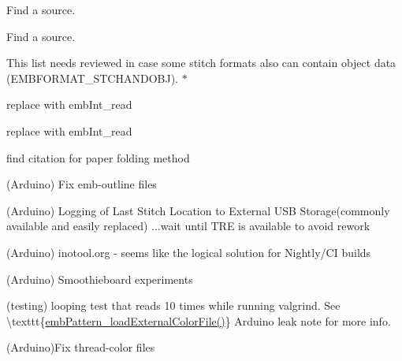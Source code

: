 \begin{DoxyRefList}
\label{todo__todo000040}%
%
Find a source.

\label{todo__todo000041}%
%
Find a source. 
\item[Global \mbox{\hyperlink{formats_8c_a8cb11404ce46501561f956d33f8dcf95}{format\+Table}} \mbox{[}number\+Of\+Formats\mbox{]}]\label{todo__todo000018}%
%
This list needs reviewed in case some stitch formats also can contain object data (EMBFORMAT\+\_\+\+STCHANDOBJ). $\ast$  
\item[Global \mbox{\hyperlink{formats_8c_a05fb50e7292226bc2947dd2b4da7a9bd}{fread\+\_\+int32\+\_\+be}} (FILE $\ast$f)]\label{todo__todo000020}%
%
replace with emb\+Int\+\_\+read  
\item[Global \mbox{\hyperlink{formats_8c_a2bcdb1e6bf6930d5c054ecdca9831eba}{fread\+\_\+uint16}} (FILE $\ast$f)]\label{todo__todo000019}%
%
replace with emb\+Int\+\_\+read  
\item[Global \mbox{\hyperlink{fill_8c_ad02b5d945eacff708d2bf084c40044d8}{generate\+\_\+dragon\+\_\+curve}} (char $\ast$state, int iterations)]\label{todo__todo000013}%
%
find citation for paper folding method  
\item[Page \mbox{\hyperlink{md_embroidermodder2_extern_libembroidery_src_geometry_geometry}{Geometry and Algorithms}} ]\label{todo__todo000031}%
%
(Arduino) Fix emb-\/outline files

\label{todo__todo000033}%
%
(Arduino) Logging of Last Stitch Location to External USB Storage(commonly available and easily replaced) ...wait until TRE is available to avoid rework

\label{todo__todo000034}%
%
(Arduino) inotool.\+org -\/ seems like the logical solution for Nightly/\+CI builds

\label{todo__todo000035}%
%
(Arduino) Smoothieboard experiments

\label{todo__todo000036}%
%
(testing) looping test that reads 10 times while running valgrind. See \textbackslash{}texttt\{\mbox{\hyperlink{embroidery_8h_a3bf191bd99e2da8d36465f454a4646f6}{emb\+Pattern\+\_\+load\+External\+Color\+File()}}\} Arduino leak note for more info.

\label{todo__todo000032}%
%
(Arduino)Fix thread-\/color files


\end{DoxyRefList}
